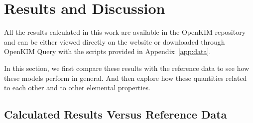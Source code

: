 \documentclass[%
 reprint,
 amsmath,amssymb,
 aps,
]{revtex4-1}
\begin{document}
\section{\label{sec:results}Results and Discussion}

All the results calculated in this work are available in the OpenKIM repository \cite{openkim2016} and can be either viewed directly on the website or downloaded through OpenKIM Query with the scripts provided in Appendix~\ref{app:data}.

In this section, we first compare these results with the reference data to see how these models perform in general.
And then explore how these quantities related to each other and to other elemental properties.

\subsection{\label{sec:calcvsref}Calculated Results Versus Reference Data}
\end{document}
